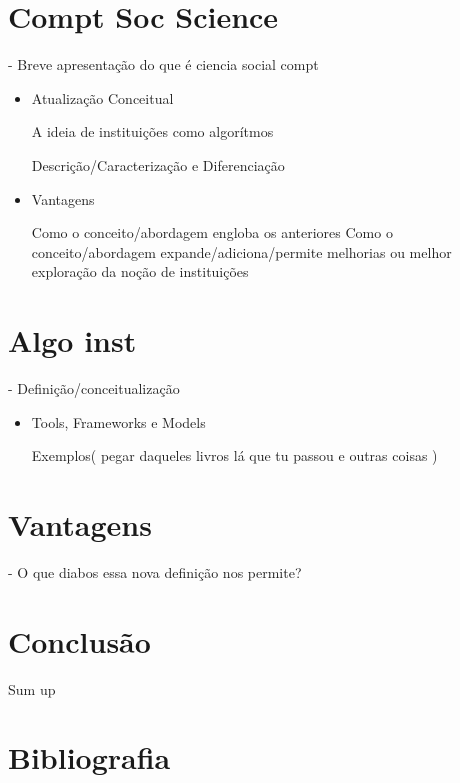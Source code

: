 \documentclass{article}
\begin{document}
\section{ Compt Soc Science } - Breve apresentação do que é ciencia social compt

\begin{itemize}

\item Atualização Conceitual

    \subitem A ideia de instituições como algorítmos
    
        \subsubitem Descrição/Caracterização e Diferenciação
        
\item Vantagens

    \subitem Como o conceito/abordagem engloba os anteriores
    \subitem Como o conceito/abordagem expande/adiciona/permite melhorias ou melhor exploração da noção de instituições

\end{itemize}

\section{ Algo inst } - Definição/conceitualização

\begin{itemize}

\item Tools, Frameworks e Models

    \subitem Exemplos( pegar daqueles livros lá que tu passou e outras coisas )

\end{itemize}

\section{ Vantagens } - O que diabos essa nova definição nos permite?

\section{ Conclusão }

Sum up

\newpage

\section*{ Bibliografia }
\end{document}
